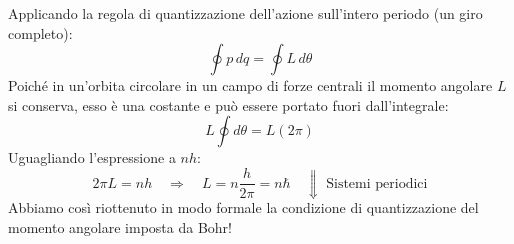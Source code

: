 \documentclass[11pt, a4paper]{article}
\begin{document}
Applicando la regola di quantizzazione dell'azione sull'intero periodo (un giro completo): %
\begin{equation*}
    \oint p \, dq = \oint L \, d\theta %
\end{equation*}
Poiché in un'orbita circolare in un campo di forze centrali il momento angolare $L$ si conserva, esso è una costante e può essere portato fuori dall'integrale: %
\begin{equation*}
    L \oint d\theta = L (2\pi) %
\end{equation*}
Uguagliando l'espressione a $nh$: %
\begin{equation}
    2\pi L = n h \quad \Rightarrow \quad \boxed{ L = n \frac{h}{2\pi} = n\hbar } \quad \Downarrow \text{ Sistemi periodici} %
\end{equation}
Abbiamo così riottenuto in modo formale la condizione di quantizzazione del momento angolare imposta da Bohr! %
\end{document}
